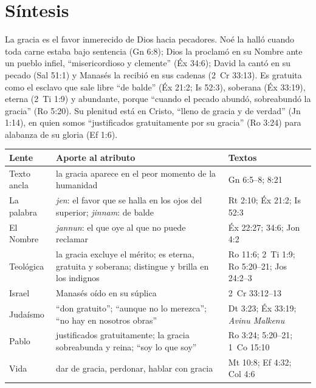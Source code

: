 \section{Síntesis}

\begin{tcolorbox}[colback=papiro,colframe=azul,boxrule=1pt,arc=3pt,fonttitle=\bfseries,title=La gracia de Dios]
La gracia es el favor inmerecido de Dios hacia pecadores. Noé la halló cuando toda carne estaba bajo sentencia (Gn 6:8); Dios la proclamó en su Nombre ante un pueblo infiel, ``misericordioso y clemente'' (Éx 34:6); David la cantó en su pecado (Sal 51:1) y Manasés la recibió en sus cadenas (2~Cr 33:13). Es gratuita como el esclavo que sale libre ``de balde'' (Éx 21:2; Is 52:3), soberana (Éx 33:19), eterna (2~Ti 1:9) y abundante, porque ``cuando el pecado abundó, sobreabundó la gracia'' (Ro 5:20). Su plenitud está en Cristo, ``lleno de gracia y de verdad'' (Jn 1:14), en quien somos ``justificados gratuitamente por su gracia'' (Ro 3:24) para alabanza de su gloria (Ef 1:6).
\end{tcolorbox}

\begin{center}\small\renewcommand{\arraystretch}{1.22}
\begin{tabular}{@{}L{3.2cm}L{6.8cm}L{4.4cm}@{}}
\toprule
\textbf{Lente} & \textbf{Aporte al atributo} & \textbf{Textos} \\ \midrule
Texto ancla & la gracia aparece en el peor momento de la humanidad & Gn 6:5--8; 8:21 \\
La palabra & \emph{jen}: el favor que se halla en los ojos del superior; \emph{jinnam}: de balde & Rt 2:10; Éx 21:2; Is 52:3 \\
El Nombre & \emph{jannun}: el que oye al que no puede reclamar & Éx 22:27; 34:6; Jon 4:2 \\
Teológica & la gracia excluye el mérito; es eterna, gratuita y soberana; distingue y brilla en los indignos & Ro 11:6; 2~Ti 1:9; Ro 5:20--21; Jos 24:2--3 \\
Israel & Manasés oído en su súplica & 2~Cr 33:12--13 \\
Judaísmo & ``don gratuito''; ``aunque no lo merezca''; ``no hay en nosotros obras'' & Dt 3:23; Éx 33:19; \emph{Avinu Malkenu} \\
Pablo & justificados gratuitamente; la gracia sobreabunda y reina; ``soy lo que soy'' & Ro 3:24; 5:20--21; 1~Co 15:10 \\
Vida & dar de gracia, perdonar, hablar con gracia & Mt 10:8; Ef 4:32; Col 4:6 \\
\bottomrule
\end{tabular}\end{center}

